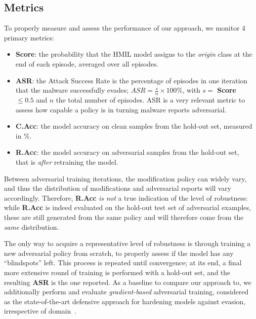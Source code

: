 \subsection{Metrics}

To properly measure and assess the performance of our approach, we monitor 4 primary metrics:
\begin{itemize}
    \item \textbf{Score}: the probability that the HMIL model assigns to the \textit{origin} class at the end of each episode, averaged over all episodes.
    \item \textbf{ASR}: the Attack Success Rate is the percentage of episodes in one iteration that the malware successfully evades; $ASR = \frac{s}{n} \times 100\%$, with $s =$ \textbf{Score} $\leq 0.5$ and $n$ the total number of episodes. ASR is a very relevant metric to assess how capable a policy is in turning malware reports adversarial.
    \item \textbf{C.Acc}: the model accuracy on clean samples from the hold-out set, measured in \%.
    \item \textbf{R.Acc}: the model accuracy on adversarial samples from the hold-out set, that is \textit{after} retraining the model.
\end{itemize}

Between adversarial training iterations, the modification policy can widely vary, and thus the distribution of modifications and adversarial reports will vary accordingly.
Therefore, \textbf{R.Acc} \textit{is not} a true indication of the level of robustness: while \textbf{R.Acc} is indeed evaluated on the hold-out test set of adversarial examples, these are still generated from the same policy and will therefore come from the \textit{same} distribution.

The only way to acquire a representative level of robustness is through training a new adversarial policy from scratch, to properly assess if the model has any ``blindspots'' left.
This process is repeated until convergence; at its end, a final more extensive round of training is performed with a hold-out set, and the resulting \textbf{ASR} is the one reported.
As a baseline to compare our approach to, we additionally perform and evaluate \textit{gradient-based} adversarial training, considered as the state-of-the-art defensive approach for hardening models against evasion, irrespective of domain~\cite{madry2017towards}.


